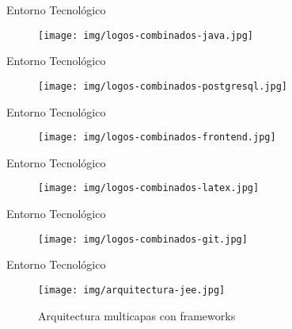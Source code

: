 \documentclass[spanish,xcolor=table,svgnames]{beamer}
\begin{document}
\begin{frame}{Entorno Tecnológico}
  \begin{figure}[H]
    \begin{center}
        \texttt{[image: img/logos-combinados-java.jpg]}
    \end{center}
    \label{fig:tecnologias-java}
  \end{figure}
\end{frame}

\begin{frame}{Entorno Tecnológico}
  \begin{figure}[H]
    \begin{center}
        \texttt{[image: img/logos-combinados-postgresql.jpg]}
    \end{center}
    \label{fig:tecnologias-bd}
  \end{figure}
\end{frame}

\begin{frame}{Entorno Tecnológico}
  \begin{figure}[H]
    \begin{center}
        \texttt{[image: img/logos-combinados-frontend.jpg]}
    \end{center}
    \label{fig:tecnologias-frontend}
  \end{figure}
\end{frame}

\begin{frame}{Entorno Tecnológico}
  \begin{figure}[H]
    \begin{center}
        \texttt{[image: img/logos-combinados-latex.jpg]}
    \end{center}
    \label{fig:tecnologias-latex}
  \end{figure}
\end{frame}

\begin{frame}{Entorno Tecnológico}
  \begin{figure}[H]
    \begin{center}
        \texttt{[image: img/logos-combinados-git.jpg]}
    \end{center}
    \label{fig:tecnologias-git}
  \end{figure}
\end{frame}


\begin{frame}{Entorno Tecnológico}
  \begin{figure}[H]
    \begin{center}
        \texttt{[image: img/arquitectura-jee.jpg]}
    \end{center}
      \caption{Arquitectura multicapas con frameworks}
    \label{fig:arquitectura-jee}
  \end{figure}
\end{frame}
\end{document}
